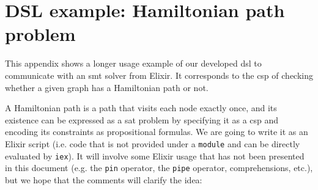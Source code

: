 \chapter{DSL example: Hamiltonian path problem}
\label{Appendix:hamiltonian}

This appendix shows a longer usage example of our developed \gls{dsl} to 
communicate with an \acrshort{smt} solver from Elixir. It corresponds to the
\gls{csp} of checking whether a given graph has a Hamiltonian path or not.

A Hamiltonian path is a path that visits each node exactly once, and its
existence can be expressed as a \gls{sat} problem by specifying it as a
\gls{csp} and encoding its constraints as propositional formulas. We are going
to write it as an Elixir script (i.e. code that is not provided under a
\verb|module| and can be directly evaluated by \verb|iex|). It will involve some
Elixir usage that has not been presented in this document (e.g.  the \verb|pin|
operator, the \verb|pipe| operator, comprehensions, etc.), but we hope that the
comments will clarify the idea:

